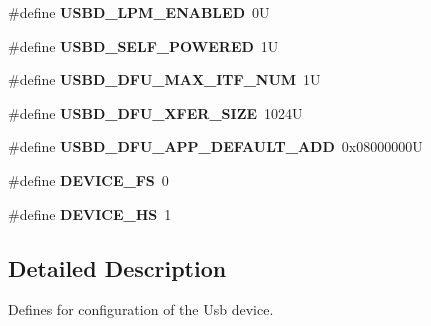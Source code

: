 \begin{DoxyCompactItemize}
\#define {\bfseries U\+S\+B\+D\+\_\+\+L\+P\+M\+\_\+\+E\+N\+A\+B\+L\+ED}~0U
\item 
\mbox{\label{group__USBD__CONF__Exported__Defines_ga07065dc40f090f051dd1dd6d5901930a}} 
\#define {\bfseries U\+S\+B\+D\+\_\+\+S\+E\+L\+F\+\_\+\+P\+O\+W\+E\+R\+ED}~1U
\item 
\mbox{\label{group__USBD__CONF__Exported__Defines_gac278e38c505e54697f83f5de2bffb80e}} 
\#define {\bfseries U\+S\+B\+D\+\_\+\+D\+F\+U\+\_\+\+M\+A\+X\+\_\+\+I\+T\+F\+\_\+\+N\+UM}~1U
\item 
\mbox{\label{group__USBD__CONF__Exported__Defines_gaa27a82c663210b67fc71bead42edbd32}} 
\#define {\bfseries U\+S\+B\+D\+\_\+\+D\+F\+U\+\_\+\+X\+F\+E\+R\+\_\+\+S\+I\+ZE}~1024U
\item 
\mbox{\label{group__USBD__CONF__Exported__Defines_ga673097e9810037fe4e8c76c0c0a688da}} 
\#define {\bfseries U\+S\+B\+D\+\_\+\+D\+F\+U\+\_\+\+A\+P\+P\+\_\+\+D\+E\+F\+A\+U\+L\+T\+\_\+\+A\+DD}~0x08000000U
\item 
\mbox{\label{group__USBD__CONF__Exported__Defines_ga609db9b232fa154e9b1c86bcdd17e97c}} 
\#define {\bfseries D\+E\+V\+I\+C\+E\+\_\+\+FS}~0
\item 
\mbox{\label{group__USBD__CONF__Exported__Defines_ga4743bb97c140c3615b999a81a0301815}} 
\#define {\bfseries D\+E\+V\+I\+C\+E\+\_\+\+HS}~1
\end{DoxyCompactItemize}


\subsection{Detailed Description}
Defines for configuration of the Usb device. 

